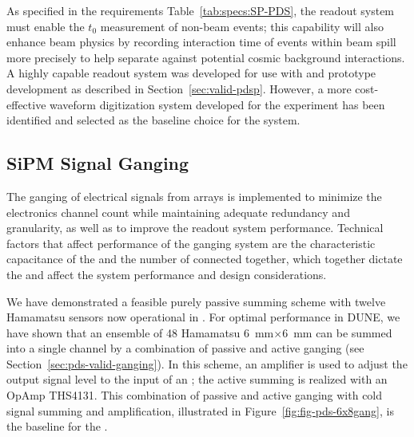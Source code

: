 As specified in the requirements Table~\ref{tab:specs:SP-PDS}, the readout system must enable the $t_0$ measurement of non-beam events; this capability will also enhance beam physics by recording interaction time of events within 
beam spill more precisely to help separate against potential cosmic background interactions. A highly capable readout system was developed for use with  and prototype development as described in Section~\ref{sec:valid-pdsp}. However, a more cost-effective waveform digitization system developed for the  experiment has been identified and selected as the baseline choice for the  system. 


\subsection{SiPM Signal Ganging}
\label{sec:pds-design-ganging}

The ganging of electrical signals from  arrays is implemented to minimize the electronics channel count while maintaining adequate redundancy and granularity, as well as to improve the readout system performance.  
Technical factors that affect performance of the ganging system are the characteristic capacitance of the  and the number of  connected together, which together dictate the  and affect the system performance and design considerations.

We have demonstrated a feasible purely passive summing scheme with twelve Hamamatsu  sensors now operational in . For optimal performance in DUNE, we have shown that an ensemble of 48 Hamamatsu \SI{6}{mm}$\times$\SI{6}{mm}  can be summed into a single channel by a combination of passive and active ganging (see Section~\ref{sec:pds-valid-ganging}).  In this scheme, an amplifier is used to adjust the  output signal level to the input of an ; the active summing is realized with an OpAmp THS4131. This combination of passive and active ganging with cold signal summing and amplification, illustrated in Figure~\ref{fig:fig-pds-6x8gang}, is the baseline for the .


